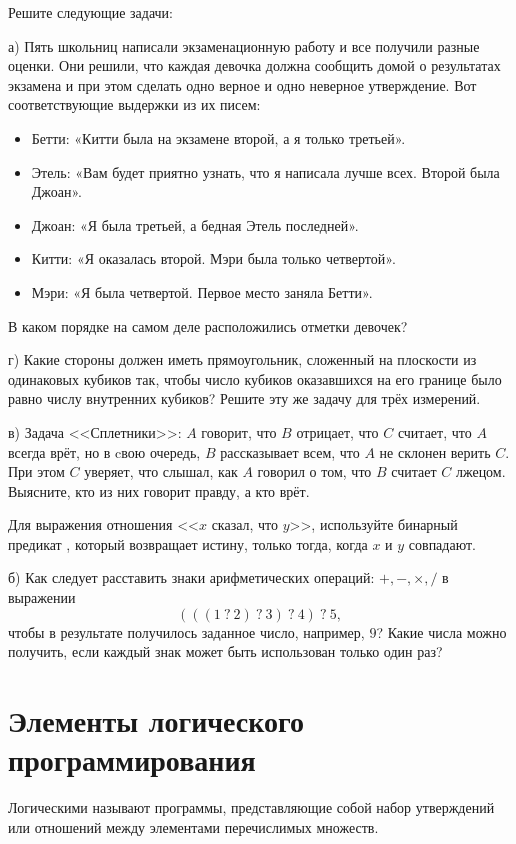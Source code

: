 \begin{Assignment}
Решите следующие задачи:

\medskip
а) Пять школьниц написали экзаменационную работу и все получили разные оценки. Они решили, что каждая девочка должна сообщить домой о результатах экзамена и при этом сделать одно верное и
одно неверное утверждение. Вот соответствующие выдержки из их писем:
\begin{itemize}
  \item Бетти: «Китти была на экзамене второй, а я только третьей».
  \item Этель: «Вам будет приятно узнать, что я написала лучше всех. Второй была Джоан».
  \item Джоан: «Я была третьей, а бедная Этель последней».
  \item Китти: «Я оказалась второй. Мэри была только четвертой».
  \item Мэри: «Я была четвертой. Первое место заняла Бетти».
\end{itemize}
 В каком порядке на самом деле расположились отметки девочек?
 
 \medskip
 г)\label{as:rectangles} Какие стороны должен иметь прямоугольник, сложенный на плоскости из одинаковых кубиков так, чтобы число кубиков оказавшихся на его границе было равно числу внутренних кубиков? Решите эту же задачу для трёх измерений.

  \medskip
 в) Задача <<Сплетники>>: $A$ говорит, что $B$ отрицает, что $C$ считает, что $A$ всегда врёт, но в cвою очередь, $B$ рассказывает всем, что $A$ не склонен верить $C$. При этом $C$ уверяет, что слышал, как $A$ говорил о том, что $B$ считает $C$ лжецом. Выясните, кто из них говорит правду, а кто врёт.
 
 Для выражения отношения <<$x$ сказал, что $y$>>, используйте бинарный предикат , который возвращает истину, только тогда, когда $x$ и $y$ совпадают.

\medskip
 б) Как следует расставить знаки арифметических операций: $+, -, \times, /$ в выражении $$(((1~?~2)~?~3)~?~4)~?~5,$$ чтобы в результате получилось заданное число, например, $9$? Какие числа можно получить, если каждый знак может быть использован только один раз?
\end{Assignment}






\section{Элементы логического программирования}%
Логическими называют программы, представляющие собой набор утверждений или отношений между элементами перечислимых множеств. 

